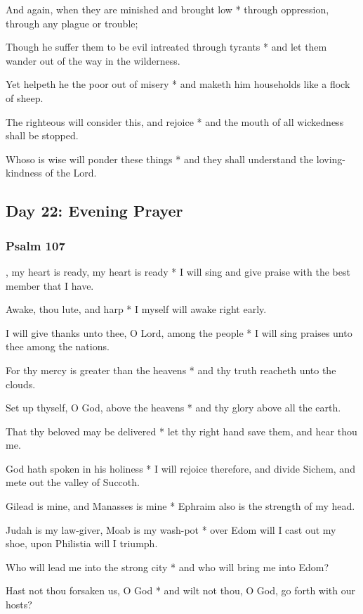 And again, when they are minished and brought low * through oppression, through any plague or trouble;

Though he suffer them to be evil intreated through tyrants * and let them wander out of the way in the wilderness.

Yet helpeth he the poor out of misery * and maketh him households like a flock of sheep.

The righteous will consider this, and rejoice * and the mouth of all wickedness shall be stopped.

Whoso is wise will ponder these things * and they shall understand the loving-kindness of the Lord.

\subsection{Day 22: Evening Prayer}

\subsubsection{Psalm 107}


, my heart is ready, my heart is ready * I will sing and give praise with the best member that I have.

Awake, thou lute, and harp * I myself will awake right early.

I will give thanks unto thee, O Lord, among the people * I will sing praises unto thee among the nations.

For thy mercy is greater than the heavens * and thy truth reacheth unto the clouds.

Set up thyself, O God, above the heavens * and thy glory above all the earth.

That thy beloved may be delivered * let thy right hand save them, and hear thou me.

God hath spoken in his holiness * I will rejoice therefore, and divide Sichem, and mete out the valley of Succoth.

Gilead is mine, and Manasses is mine * Ephraim also is the strength of my head.

Judah is my law-giver, Moab is my wash-pot * over Edom will I cast out my shoe, upon Philistia will I triumph.

Who will lead me into the strong city * and who will bring me into Edom?

Hast not thou forsaken us, O God * and wilt not thou, O God, go forth with our hosts?

